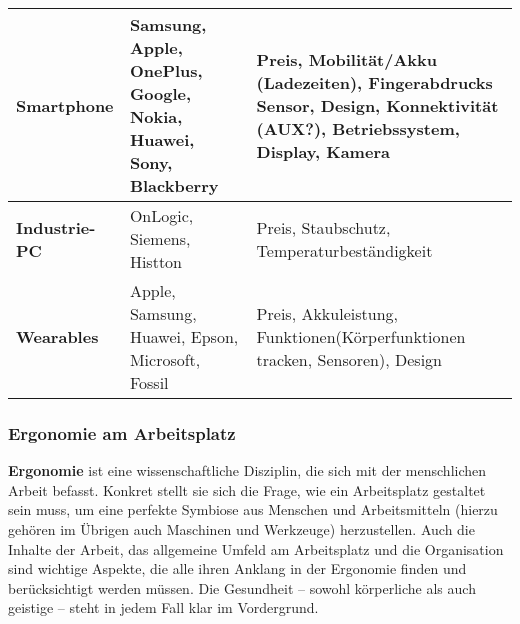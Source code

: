 \documentclass[asp1.tex]{subfiles}
\begin{document}
\begin{longtable}{|l|p{6cm}|p{6cm}|}
    \textbf{Smartphone}      & Samsung, Apple, OnePlus, Google, Nokia, Huawei, Sony, Blackberry & Preis, Mobilität/Akku (Ladezeiten), Fingerabdrucks Sensor, Design, Konnektivität (AUX?), Betriebssystem, Display, Kamera                                                                                                                                                       \\\hline

    \textbf{Industrie-PC}    & OnLogic, Siemens, Histton                                        & Preis, Staubschutz, Temperaturbeständigkeit                                                                                                                                                                                                                                    \\\hline

    \textbf{Wearables}       & Apple, Samsung, Huawei, Epson, Microsoft, Fossil                 & Preis, Akkuleistung, Funktionen(Körperfunktionen tracken, Sensoren), Design

    \\\hline
\end{longtable}

\break

\subsubsection{Ergonomie am Arbeitsplatz}

\textbf{Ergonomie} ist eine wissenschaftliche Disziplin, die sich mit der menschlichen Arbeit befasst. Konkret stellt sie sich die Frage, wie ein Arbeitsplatz gestaltet sein muss, um eine perfekte Symbiose aus Menschen und Arbeitsmitteln (hierzu gehören im Übrigen auch Maschinen und Werkzeuge) herzustellen. Auch die Inhalte der Arbeit, das allgemeine Umfeld am Arbeitsplatz und die Organisation sind wichtige Aspekte, die alle ihren Anklang in der Ergonomie finden und berücksichtigt werden müssen. Die Gesundheit – sowohl körperliche als auch geistige – steht in jedem Fall klar im Vordergrund.
\end{document}
